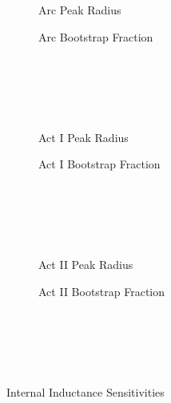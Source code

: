 \begin{figure*}
    \centering
    \hfill 
    \begin{subfigure}[t]{0.45\textwidth}
        \centering
		\begin{adjustbox}{width=\textwidth}
			\Large
			
		\end{adjustbox}
        \caption{Arc Peak Radius}
    \end{subfigure}
    \hfill
    \begin{subfigure}[t]{0.45\textwidth}
        \centering
		\begin{adjustbox}{width=\textwidth}
			\Large
			
		\end{adjustbox}
        \caption{Arc Bootstrap Fraction}
    \end{subfigure}
    \hfill \hfill ~\\ ~\\ ~\\ ~\\
    \hfill 
    \begin{subfigure}[t]{0.45\textwidth}
        \centering
		\begin{adjustbox}{width=\textwidth}
			\Large
			
		\end{adjustbox}
        \caption{Act I Peak Radius}
    \end{subfigure}
    \hfill
    \begin{subfigure}[t]{0.45\textwidth}
        \centering
		\begin{adjustbox}{width=\textwidth}
			\Large
			
		\end{adjustbox}
        \caption{Act I Bootstrap Fraction}
    \end{subfigure}
    \hfill \hfill ~\\ ~\\ ~\\ ~\\
    \hfill 
    \begin{subfigure}[t]{0.45\textwidth}
        \centering
		\begin{adjustbox}{width=\textwidth}
			\Large
			
		\end{adjustbox}
        \caption{Act II Peak Radius}
    \end{subfigure}
    \hfill
    \begin{subfigure}[t]{0.45\textwidth}
        \centering
		\begin{adjustbox}{width=\textwidth}
			\Large
			
		\end{adjustbox}
        \caption{Act II Bootstrap Fraction}
    \end{subfigure}
    \hfill \hfill ~\\ ~\\ ~\\ ~\\
    \caption{Internal Inductance Sensitivities}
    \label{fig:inductance_sensitivities}
\end{figure*}

